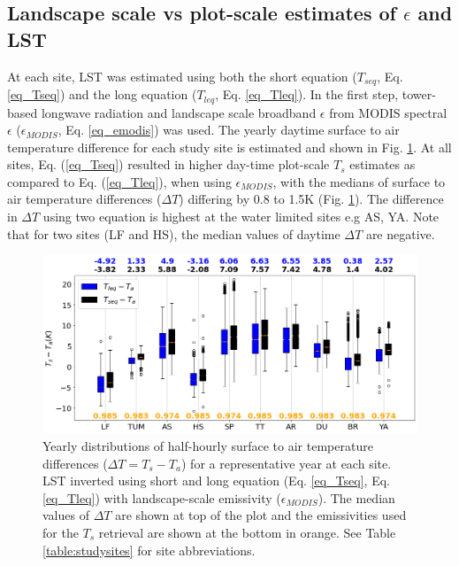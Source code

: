 \documentclass[fleqn,10pt]{wlscirep}
\begin{document}
\subsection{Landscape scale vs plot-scale estimates of $\epsilon$ and LST}
At each site, LST was estimated using both the short equation ($T_{seq}$, Eq. \ref{eq_Tseq}) and the long equation ($T_{leq}$, Eq. \ref{eq_Tleq}). In the first step, tower-based longwave radiation and landscape scale broadband $\epsilon$ from MODIS spectral $\epsilon$ ($\epsilon_{MODIS}$, Eq. \ref{eq_emodis}) was used. The yearly daytime surface to air temperature difference for each study site is estimated and shown in Fig. \ref{fig:long_short_eq_epsilon_MODIS}. At all sites, Eq. (\ref{eq_Tseq}) resulted in higher day-time plot-scale $T_{s}$ estimates as compared to Eq. (\ref{eq_Tleq}), when using $\epsilon_{MODIS}$, with the medians of surface to air temperature differences ($\Delta T$) differing by 0.8 to 1.5K (Fig. \ref{fig:long_short_eq_epsilon_MODIS}). The difference in $\Delta T$ using two equation is highest at the water limited sites e.g AS, YA. Note that for two sites (LF and HS), the median values of daytime $\Delta T$ are negative.
\begin{figure}[h!]
	\includegraphics[scale=0.35]{Ts_Talocalleqseq.png}
	\centering
    \caption{
     Yearly distributions of half-hourly surface to air temperature differences ($\Delta T = T_s - T_a$) for a representative year at each site.  %
    LST inverted using short and long equation (Eq. \ref{eq_Tseq}, Eq. \ref{eq_Tleq}) with landscape-scale emissivity ($\epsilon_{MODIS}$).
    The median values of $\Delta T$ are shown at top of the plot and the emissivities used for the $T_{s}$ retrieval are shown at the bottom in orange. See Table \ref{table:studysites} for site abbreviations.}
	\label{fig:long_short_eq_epsilon_MODIS}
\end{figure}
\end{document}
